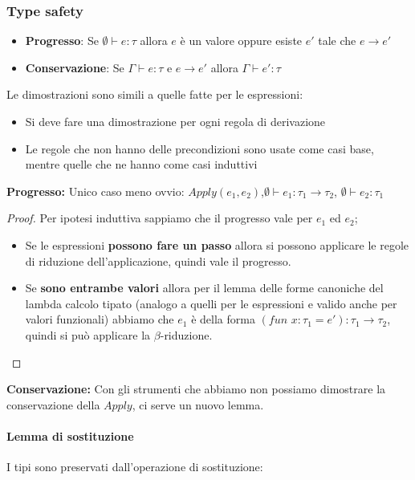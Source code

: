 \documentclass[a4paper,10pt]{article}
\begin{document}
\subsubsection{Type safety}
\begin{itemize}
 \item \textbf{Progresso}: Se $\emptyset \vdash e:\tau$ allora $e$ è un valore oppure esiste $e'$ tale che $e \to e'$
 \item \textbf{Conservazione}: Se $\Gamma \vdash e:\tau$ e $e \to e'$ allora $\Gamma \vdash e' : \tau$
\end{itemize}
Le dimostrazioni sono simili a quelle fatte per le espressioni:
\begin{itemize}
 \item Si deve fare una dimostrazione per ogni regola di derivazione
 \item Le regole che non hanno delle precondizioni sono usate come casi base, mentre quelle che ne hanno come casi induttivi

 \end{itemize} 
 
 \textbf{Progresso:}
 Unico caso meno ovvio: $Apply(e_1, e_2)$,\quad  $\emptyset\vdash e_1 : \tau_1 \to \tau_2$, \quad$\emptyset \vdash e_2 : \tau_1$
 \begin{proof}
  
 Per ipotesi induttiva sappiamo che il progresso vale per $e_1$ ed $e_2$; 
 
 \begin{itemize}
  \item Se le espressioni \textbf{possono fare un passo} allora si possono applicare le regole di riduzione dell'applicazione, quindi vale il progresso.
  \item Se \textbf{sono entrambe valori} allora per il lemma delle forme canoniche del lambda calcolo tipato (analogo a quelli per le espressioni e valido anche per valori funzionali) abbiamo che $e_1$ è della forma $(fun \,\, x:\tau_1 = e'): \tau_1 \to \tau_2$, quindi si può applicare la $\beta$-riduzione.
 \end{itemize}
 \end{proof}

  
  \textbf{Conservazione:} Con gli strumenti che abbiamo non possiamo dimostrare la conservazione della $Apply$, ci serve un nuovo lemma.
  
  \paragraph{Lemma di sostituzione}
   I tipi sono preservati dall'operazione di sostituzione:
\end{document}

